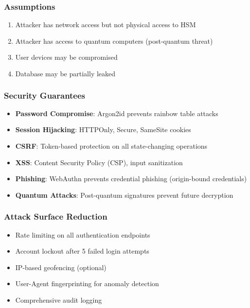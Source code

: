 \subsubsection{Assumptions}

\begin{enumerate}
  \item Attacker has network access but not physical access to HSM
  \item Attacker has access to quantum computers (post-quantum threat)
  \item User devices may be compromised
  \item Database may be partially leaked
\end{enumerate}

\subsubsection{Security Guarantees}

\begin{itemize}
  \item \textbf{Password Compromise}: Argon2id prevents rainbow table attacks
  \item \textbf{Session Hijacking}: HTTPOnly, Secure, SameSite cookies
  \item \textbf{CSRF}: Token-based protection on all state-changing operations
  \item \textbf{XSS}: Content Security Policy (CSP), input sanitization
  \item \textbf{Phishing}: WebAuthn prevents credential phishing (origin-bound credentials)
  \item \textbf{Quantum Attacks}: Post-quantum signatures prevent future decryption
\end{itemize}

\subsubsection{Attack Surface Reduction}

\begin{itemize}
  \item Rate limiting on all authentication endpoints
  \item Account lockout after 5 failed login attempts
  \item IP-based geofencing (optional)
  \item User-Agent fingerprinting for anomaly detection
  \item Comprehensive audit logging
\end{itemize}

